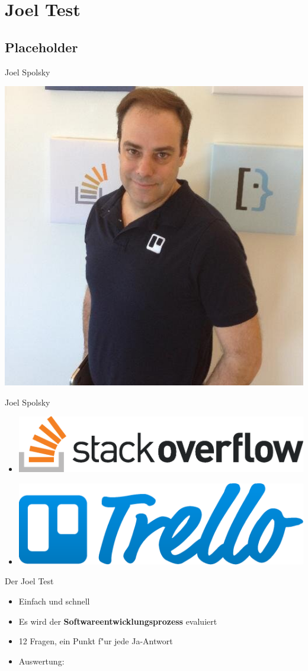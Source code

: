 \documentclass{beamer}
\begin{document}
\section{Joel Test}
\subsection{Placeholder}
\begin{frame}{Joel Spolsky}
	\begin{center}
		\includegraphics[width=.4\textwidth]{spolsky.jpeg}
	\end{center}
\end{frame}
\begin{frame}{Joel Spolsky}
	\begin{itemize}
		\setlength\itemsep{2em}
		\item[] \parbox{\linewidth}{\centering \includegraphics[width=.5\textwidth]{so-logo.eps}}
		\item[] \parbox{\linewidth}{\centering \includegraphics[width=.5\textwidth]{trello-logo-blue.eps}}
	\end{itemize}
\end{frame}

\begin{frame}{Der Joel Test}
	\begin{itemize}
		\item<1-> Einfach und schnell
		\item<2-> Es wird der \textbf{Softwareentwicklungsprozess} evaluiert
		\item<3-> 12 Fragen, ein Punkt f"ur jede \glqq{}Ja\grqq{}-Antwort
		\item<4-> Auswertung:
			\begin{description}[labelwidth=\widthof{10 Punkte:}]
				\item[12 Punkte:] \Laughey
				\item[11 Punkte:] \Neutrey
				\item[$\leqslant 10$ Punkte:] \Xey
			\end{description}
	\end{itemize}
\end{frame}
\end{document}
